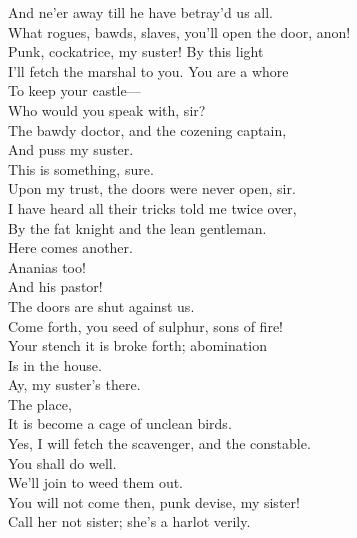 \documentclass[a4paper,oneside]{memoir}
\begin{document}
\begin{drama*}
And ne'er away till he have betray'd us all.\\
\kastrilspeaks {} What rogues, bawds, slaves, you'll open the door, anon!\\
Punk, cockatrice, my suster! By this light\\
I'll fetch the marshal to you. You are a whore\\
To keep your castle---\\
\facespeaks {} Who would you speak with, sir?\\
\kastrilspeaks The bawdy doctor, and the cozening captain,\\
And puss my suster.\\
\lovewitspeaks {} This is something, sure.\\
\facespeaks Upon my trust, the doors were never open, sir.\\
\kastrilspeaks I have heard all their tricks told me twice over,\\
By the fat knight and the lean gentleman.\\
\lovewitspeaks Here comes another.\\
\facespeaks {} Ananias too!\\
And his pastor!\\
\tribulationspeaks {}  The doors are shut against us.\\
\ananiasspeaks Come forth, you seed of sulphur, sons of fire!\\
Your stench it is broke forth; abomination\\
Is in the house.\\
\kastrilspeaks {} Ay, my suster's there.\\
\ananiasspeaks {} The place,\\
It is become a cage of unclean birds.\\
\kastrilspeaks Yes, I will fetch the scavenger, and the constable.\\
\tribulationspeaks You shall do well.\\
\ananiasspeaks {} We'll join to weed them out.\\
\kastrilspeaks You will not come then, punk devise, my sister!\\
\ananiasspeaks Call her not sister; she's a harlot verily.\\

\end{drama*}
\end{document}
